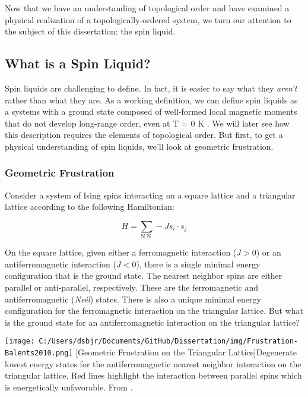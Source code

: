 Now that we have an understanding of topological order and have examined a physical realization of a topologically-ordered system, we turn our attention to the subject of this dissertation: the spin liquid.

\subsection{What is a Spin Liquid?}

Spin liquids are challenging to define. In fact, it is easier to say what they \textit{aren't} rather than what they are. As a working definition, we can define spin liquids as a systems with a ground state composed of well-formed local magnetic moments that do not develop long-range order, even at T = 0 K \cite{Balents2010}. We will later see how this description requires the elements of topological order. But first, to get a physical understanding of spin liquids, we'll look at geometric frustration.

\subsubsection{Geometric Frustration}

Consider a system of Ising spins interacting on a square lattice and a triangular lattice according to the following Hamiltonian: 

\begin{equation}
H = \sum_{\text{N.N.}} -J s_{i} \cdot s_{j}
\end{equation}

On the square lattice, given either a ferromagnetic interaction ($J > 0$) or an antiferromagnetic interaction ($J < 0$), there is a single minimal energy configuration that is the ground state. The nearest neighbor spins are either parallel or anti-parallel, respectively. These are the ferromagnetic and antiferromagnetic (\textit{Ne{\'e}l}) states. There is also a unique minimal energy configuration for the ferromagnetic interaction on the triangular lattice. But what is the ground state for an antiferromagnetic interaction on the triangular lattice?

\begin{centering}
\texttt{[image: C:/Users/dsbjr/Documents/GitHub/Dissertation/img/Frustration-Balents2010.png]}
  \captionsetup{width=0.75\textwidth}
  [Geometric Frustration on the Triangular Lattice]{Degenerate lowest energy states for the antiferromagnetic nearest neighbor interaction on the triangular lattice. Red lines highlight the interaction between parallel spins which is energetically unfavorable. From \cite{Balents2010}.}
  \label{fig:Frustration1}
\end{centering}

